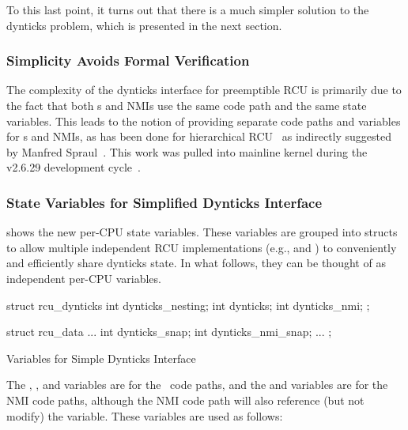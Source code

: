 To this last point, it turns out that there is a much simpler solution to
the dynticks problem, which is presented in the next section.

\subsubsection{Simplicity Avoids Formal Verification}
\label{sec:formal:Simplicity Avoids Formal Verification}

The complexity of the dynticks interface for preemptible RCU is primarily
due to the fact that both \IRQ s and NMIs use the same code path and the
same state variables.
This leads to the notion of providing separate code paths and variables
for \IRQ s and NMIs, as has been done for
hierarchical RCU~\cite{PaulEMcKenney2008HierarchicalRCU}
as indirectly suggested by
Manfred Spraul~\cite{ManfredSpraul2008StateMachineRCU}.
This work was pulled into mainline kernel during the v2.6.29
development cycle~\cite{PaulEMcKenney2008commit:64db4cfff99c}.

\subsubsection{State Variables for Simplified Dynticks Interface}
\label{sec:formal:State Variables for Simplified Dynticks Interface}

shows the new per-CPU state variables.
These variables are grouped into structs to allow multiple independent
RCU implementations (e.g.,  and ) to conveniently
and efficiently share dynticks state.
In what follows, they can be thought of as independent per-CPU variables.

\begin{listing}[tbp]
\begin{VerbatimL}
struct rcu_dynticks {
	int dynticks_nesting;
	int dynticks;
	int dynticks_nmi;
};

struct rcu_data {
	...
	int dynticks_snap;
	int dynticks_nmi_snap;
	...
};
\end{VerbatimL}
\caption{Variables for Simple Dynticks Interface}
\label{lst:formal:Variables for Simple Dynticks Interface}
\end{listing}

The , , and  variables
are for the \IRQ\ code paths, and the  and
 variables are for the NMI code paths, although
the NMI code path will also reference (but not modify) the
 variable.
These variables are used as follows:

